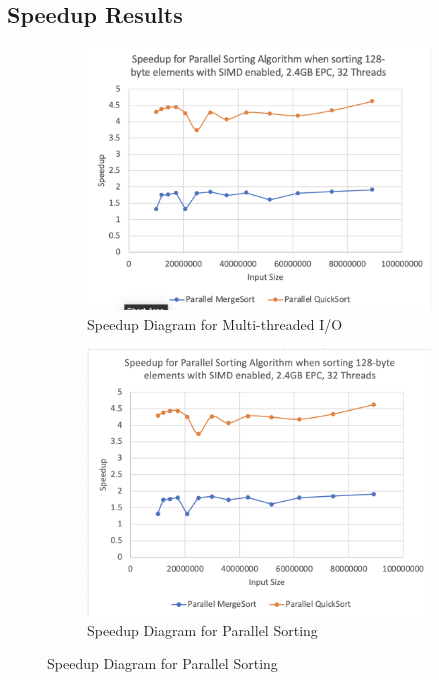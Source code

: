\documentclass{article}
\begin{document}
\subsection{Speedup Results}
\begin{figure}[h]
    \centering
    \begin{subfigure}[b]{0.3\linewidth}
        \includegraphics[width=\linewidth]{assets/io.png}
        \caption{Speedup Diagram for Multi-threaded I/O}
    \end{subfigure}
    \hfill
    \begin{subfigure}[b]{0.3\linewidth}
        \includegraphics[width=\linewidth]{assets/sort.png}
        \caption{Speedup Diagram for Parallel Sorting}

\end{subfigure}
\end{figure}
\end{document}
